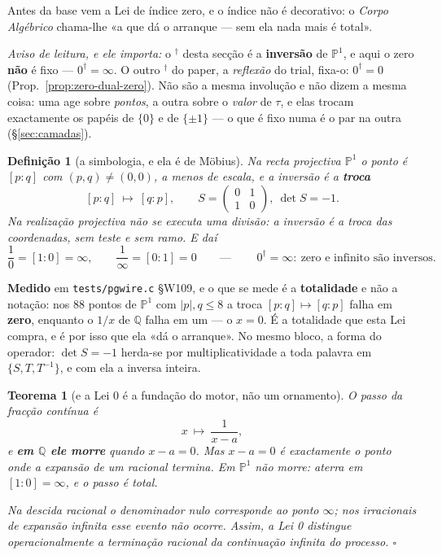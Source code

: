 \documentclass[11pt,a4paper]{article}
\newtheorem{teorema}{Teorema}
\newtheorem{definicao}{Definição}
\newcommand{\code}[1]{\texttt{\small #1}}
\newcommand{\dg}{^{\dagger}}
\begin{document}
Antes da base vem a Lei de índice zero, e o índice não é decorativo: o
\emph{Corpo Algébrico} chama-lhe «a que dá o arranque --- sem ela nada mais é
total».

\noindent\emph{Aviso de leitura, e ele importa:} o $\dg$ desta secção é a
\textbf{inversão} de $\mathbb{P}^1$, e aqui o zero \textbf{não} é fixo --- $0\dg=\infty$.
O outro $\dg$ do paper, a \emph{reflexão} do trial, fixa-o: $0\dg=0$
(Prop.~\ref{prop:zero-dual-zero}). Não são a mesma involução e não dizem a mesma coisa: uma
age sobre \emph{pontos}, a outra sobre o \emph{valor} de $\tau$, e elas trocam exactamente
os papéis de $\{0\}$ e de $\{\pm1\}$ --- o que é fixo numa é o par na outra
(\S\ref{sec:camadas}).

\begin{definicao}[a simbologia, e ela é de Möbius]\label{def:lei0}
Na recta projectiva $\mathbb{P}^1$ o ponto é $[p:q]$ com $(p,q)\neq(0,0)$, a menos
de escala, e a inversão é a \textbf{troca}
\[
\boxed{\;[p:q]\ \longmapsto\ [q:p],
\qquad S=\begin{pmatrix}0&1\\1&0\end{pmatrix},\ \det S=-1 .\;}
\]
\emph{Na realização projectiva não se executa uma divisão}: a inversão é a troca
das coordenadas, sem teste e sem ramo. E daí
\[
\frac10=[1:0]=\infty,
\qquad
\frac1\infty=[0:1]=0
\qquad\text{---}\qquad
\boxed{\;0\dg=\infty:\ \text{zero e infinito são inversos.}\;}
\]
\end{definicao}

\medskip
\noindent\textbf{Medido} em \code{tests/pgwire.c} §W109, e o que se mede é a
\textbf{totalidade} e não a notação: nos $88$ pontos de $\mathbb{P}^1$ com
$\lvert p\rvert,q\le8$ a troca $[p{:}q]\mapsto[q{:}p]$ falha em \textbf{zero},
enquanto o $1/x$ de $\mathbb{Q}$ falha em um --- o $x=0$. É a totalidade que esta Lei
compra, e é por isso que ela «dá o arranque». No mesmo bloco, a forma do operador:
$\det S=-1$ herda-se por multiplicatividade a toda palavra em $\{S,T,T^{-1}\}$, e com
ela a inversa inteira.

\begin{teorema}[e a Lei 0 é a fundação do motor, não um ornamento]\label{thm:lei0}
O passo da fracção contínua é
\[
x\ \longmapsto\ \frac{1}{x-a},
\]
e \textbf{em $\mathbb{Q}$ ele morre} quando $x-a=0$. Mas $x-a=0$ é
\emph{exactamente} o ponto onde a expansão de um racional termina. Em
$\mathbb{P}^1$ não morre: aterra em $[1:0]=\infty$, e o passo é total.

Na descida racional o denominador nulo corresponde ao ponto $\infty$; nos
irracionais de expansão infinita esse evento não ocorre. \emph{Assim, a Lei 0
distingue operacionalmente a terminação racional da continuação infinita do
processo.} $\square$
\end{teorema}
\end{document}
